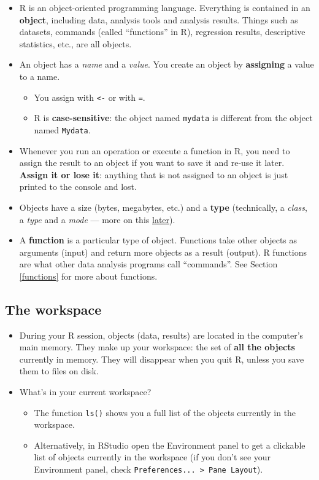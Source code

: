 \documentclass[
]{book}
\providecommand{\tightlist}{%
  \setlength{\itemsep}{0pt}\setlength{\parskip}{0pt}}
\begin{document}
\begin{itemize}
\tightlist
\item
  R is an object-oriented programming language. Everything is contained in an \textbf{object}, including data, analysis tools and analysis results. Things such as datasets, commands (called ``functions'' in R), regression results, descriptive statistics, etc., are all objects.
\item
  An object has a \emph{name} and a \emph{value}. You create an object by \textbf{assigning} a value to a name.

  \begin{itemize}
  \tightlist
  \item
    You assign with \texttt{\textless{}-} or with \texttt{=}.
  \item
    R is \textbf{case-sensitive}: the object named \texttt{mydata} is different from the object named \texttt{Mydata}.
  \end{itemize}
\item
  Whenever you run an operation or execute a function in R, you need to assign the result to an object if you want to save it and re-use it later. \textbf{Assign it or lose it}: anything that is not assigned to an object is just printed to the console and lost.
\item
  Objects have a size (bytes, megabytes, etc.) and a \textbf{type} (technically, a \emph{class}, a \emph{type} and a \emph{mode} --- more on this \protect\hyperlink{types-and-classes-of-objects}{later}).
\item
  A \textbf{function} is a particular type of object. Functions take other objects as arguments (input) and return more objects as a result (output). R functions are what other data analysis programs call ``commands''. See Section \ref{functions} for more about functions.
\end{itemize}

\hypertarget{the-workspace}{%
\subsection{The workspace}\label{the-workspace}}

\begin{itemize}
\tightlist
\item
  During your R session, objects (data, results) are located in the computer's main memory. They make up your workspace: the set of \textbf{all the objects} currently in memory. They will disappear when you quit R, unless you save them to files on disk.
\item
  What's in your current workspace?

  \begin{itemize}
  \tightlist
  \item
    The function \texttt{ls()} shows you a full list of the objects currently in the workspace.
  \item
    Alternatively, in RStudio open the Environment panel to get a clickable list of objects currently in the workspace (if you don't see your Environment panel, check \texttt{Preferences...\ \textgreater{}\ Pane\ Layout}).
  \end{itemize}
\end{itemize}
\end{document}
